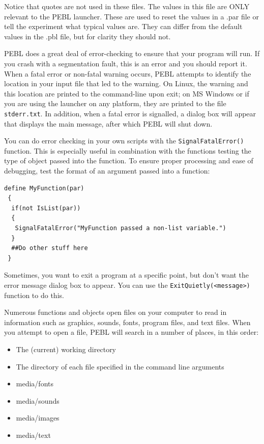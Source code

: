 Notice that quotes are not used in these files.  The values in this file are ONLY relevant to the PEBL launcher.  These are used to reset the values in a .par file or tell the experiment what typical values are.  They can differ from the default values in the .pbl file, but for clarity they should not.


PEBL does a great deal of error-checking to ensure that your program
will run.  If you crash with a segmentation fault, this is an error
and you should report it.  When a fatal error or non-fatal warning
occurs, PEBL attempts to identify the location in your input file that
led to the warning.  On Linux, the warning and this location are
printed to the command-line upon exit; on MS Windows or if you are using the launcher on any platform, they are printed
to the file \texttt{stderr.txt}.  In addition, when a fatal error is signalled, a dialog box will appear that displays the main message, after which PEBL will shut down.

You can do error checking  in your own scripts with the
\texttt{SignalFatalError()} function.  This is especially useful in
combination with the functions testing the type of object passed into 
the function.  To ensure proper processing and ease of debugging, test
the format of an argument passed into a function:

\begin{verbatim}
define MyFunction(par)
 {
  if(not IsList(par))
  {
   SignalFatalError("MyFunction passed a non-list variable.")
  }
  ##Do other stuff here
 }
\end{verbatim}
 
Sometimes, you want to exit a program at a specific point, but don't want the error message dialog box to appear.  You can use the \verb|ExitQuietly(<message>)|  function to do this.



Numerous functions and objects open files on your computer to read in
information such as graphics, sounds, fonts, program files, and text files.  When you attempt to open a file, PEBL will search in a number of places, 
in this order:
\begin{itemize}
\item
The (current) working directory
\item
The directory of each file specified in the command line arguments
\item
media/fonts
\item
media/sounds
\item
media/images
\item
media/text
\end{itemize}
  
